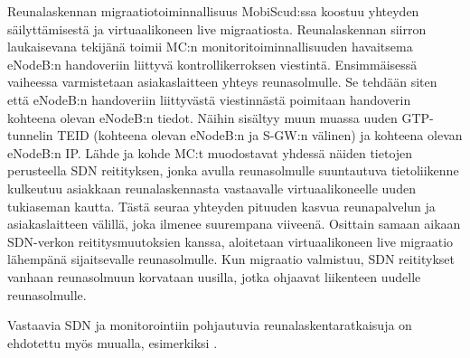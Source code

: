 Reunalaskennan migraatiotoiminnallisuus MobiScud:ssa koostuu yhteyden säilyttämisestä ja virtuaalikoneen live migraatiosta.
Reunalaskennan siirron laukaisevana tekijänä toimii MC:n monitoritoiminnallisuuden havaitsema eNodeB:n handoveriin liittyvä kontrollikerroksen viestintä.
Ensimmäisessä vaiheessa varmistetaan asiakaslaitteen yhteys reunasolmulle. 
Se tehdään siten että eNodeB:n handoveriin liittyvästä viestinnästä poimitaan handoverin kohteena olevan eNodeB:n tiedot.
Näihin sisältyy muun muassa uuden GTP-tunnelin TEID (kohteena olevan eNodeB:n ja S-GW:n välinen) ja kohteena olevan eNodeB:n IP.
Lähde ja kohde MC:t muodostavat yhdessä näiden tietojen perusteella SDN reitityksen, jonka avulla reunasolmulle suuntautuva tietoliikenne kulkeutuu asiakkaan reunalaskennasta vastaavalle virtuaalikoneelle uuden tukiaseman kautta.
Tästä seuraa yhteyden pituuden kasvua reunapalvelun ja asiakaslaitteen välillä, joka ilmenee suurempana viiveenä. 
Osittain samaan aikaan SDN-verkon reititysmuutoksien kanssa, aloitetaan virtuaalikoneen live migraatio lähempänä sijaitsevalle reunasolmulle.
Kun migraatio valmistuu, SDN reititykset vanhaan reunasolmuun korvataan uusilla, jotka ohjaavat liikenteen uudelle reunasolmulle.

Vastaavia SDN ja monitorointiin pohjautuvia reunalaskentaratkaisuja on ehdotettu myös muualla, esimerkiksi \cite{schiller2018cds}.

